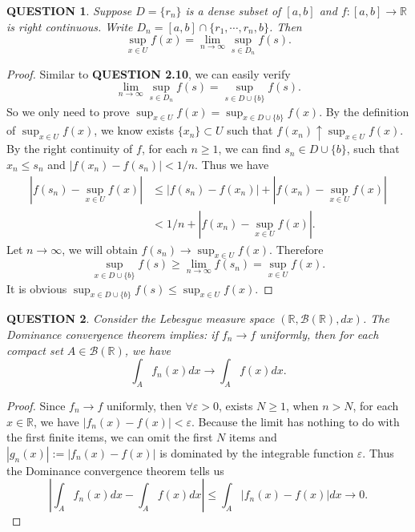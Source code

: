 \documentclass[12pt]{article}
\renewcommand{\b}{\mathscr{B}}
\renewcommand{\(}{\left(}%
\renewcommand{\)}{\right)}%
\renewcommand{\[}{\left[}%
\renewcommand{\]}{\right]}%
\renewcommand{\r}{\mathbb{R}}
\newtheorem{question}{QUESTION}[section]}
\newtheorem{proof}{Proof.}}
\begin{document}
  \begin{question}
   Suppose $D=\{r_n\}$ is a dense subset of $[a,b]$ and $f:[a,b]\to\r$ is right continuous. Write $D_n=[a,b]\cap \{r_1,\cdots,r_n,b\}$. Then
   \begin{equation*}
    \sup_{x\in U} f(x)=\lim_{n\to\infty}\sup_{s\in D_n}f(s).
   \end{equation*}
  \end{question}
  \begin{proof}
   Similar to {\bfseries QUESTION 2.10}, we can easily verify
   \begin{equation*}
    \lim_{n\to\infty}\sup_{s\in D_n}f(s)=\sup_{s\in D\cup \{b\}}f(s).
   \end{equation*}
   So we only need to prove $\sup_{x\in U} f(x)=\sup_{x\in D\cup \{b\}}f(x)$.
    By the definition of $\sup_{x\in U} f(x)$, we know exists $\{x_n\}\subset U$ such that $f(x_n)\uparrow \sup_{x\in U} f(x)$. By the right continuity of $f$, for each $n\geq 1$, we can find $s_n\in D\cup\{b\}$, such that  $x_n\leq s_n$ and $|f(x_n)-f(s_n)|<1/n$. Thus we have
    \begin{equation*}
     \begin{split}
      |f(s_n)-\sup_{x\in U} f(x)|&\leq |f(s_n)-f(x_n) |+|f(x_n)-\sup_{x\in U} f(x)|\\
      &<1/n+|f(x_n)-\sup_{x\in U} f(x)|.
     \end{split}
    \end{equation*}
    Let $n\to\infty$, we will obtain $f(s_n)\to \sup_{x\in U} f(x)$. Therefore
    \begin{equation*}
     \sup_{x\in D\cup \{b\}}f(s)\geq \lim_{n\to\infty}f(s_n)=\sup_{x\in U} f(x).
    \end{equation*}
    It is obvious $\sup_{x\in D\cup \{b\}}f(s)\leq \sup_{x\in U} f(x)$.
  \end{proof}

  \begin{question}
   Consider the Lebesgue measure space $(\r,\b(\r),dx)$. The Dominance convergence theorem implies: if $f_n\to f$ uniformly, then for each compact set $A\in\b(\r)$, we have
   \begin{equation*}
    \int_Af_n(x)dx\to \int_A f(x)dx.
   \end{equation*}
  \end{question}
  \begin{proof}
   Since $f_n\to f$ uniformly, then $\forall\varepsilon>0$, exists $N\geq 1$, when $n>N$, for each $x\in\r$, we have $|f_n(x)-f(x)|<\varepsilon$. Because the limit has nothing to do with the first finite items, we can omit the first $N$ items and $|g_n(x)|:=|f_n(x)-f(x)|$ is dominated by the integrable function $\varepsilon$. Thus the {\sffamily Dominance convergence theorem} tells us
   \begin{equation*}
    \left|\int_A f_n(x)dx-\int_Af(x)dx\right|\leq \int_A|f_n(x)-f(x)|dx\to0.
   \end{equation*}
  \end{proof}
\end{document}
